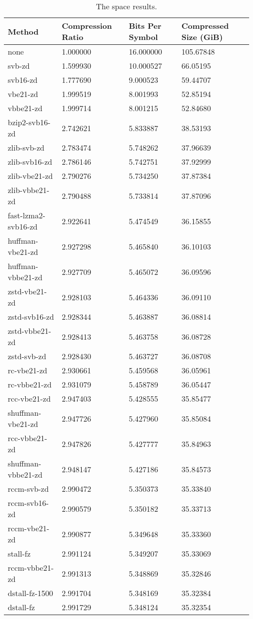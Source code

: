 \begin{table}
    \caption{\label{tab:results-space} The space results.}
	\begin{tabular}{|l|l|l|l|}
	    \hline
	    Method & Compression Ratio & Bits Per Symbol & Compressed Size (GiB) \\
\hline
		none   & 1.000000 &16.000000 &105.67848\\
              svb-zd   & 1.599930 &10.000527 & 66.05195\\
            svb16-zd   & 1.777690 & 9.000523 & 59.44707\\
            vbe21-zd   & 1.999519 & 8.001993 & 52.85194\\
	   vbbe21-zd   & 1.999714 & 8.001215 & 52.84680\\
      bzip2-svb16-zd   & 2.742621 & 5.833887 & 38.53193\\
         zlib-svb-zd   & 2.783474 & 5.748262 & 37.96639\\
       zlib-svb16-zd   & 2.786146 & 5.742751 & 37.92999\\
       zlib-vbe21-zd   & 2.790276 & 5.734250 & 37.87384\\
      zlib-vbbe21-zd   & 2.790488 & 5.733814 & 37.87096\\
 fast-lzma2-svb16-zd   & 2.922641 & 5.474549 & 36.15855\\
    huffman-vbe21-zd   & 2.927298 & 5.465840 & 36.10103\\
   huffman-vbbe21-zd   & 2.927709 & 5.465072 & 36.09596\\
       zstd-vbe21-zd   & 2.928103 & 5.464336 & 36.09110\\
       zstd-svb16-zd   & 2.928344 & 5.463887 & 36.08814\\
      zstd-vbbe21-zd   & 2.928413 & 5.463758 & 36.08728\\
         zstd-svb-zd   & 2.928430 & 5.463727 & 36.08708\\
         rc-vbe21-zd   & 2.930661 & 5.459568 & 36.05961\\
        rc-vbbe21-zd   & 2.931079 & 5.458789 & 36.05447\\
        rcc-vbe21-zd   & 2.947403 & 5.428555 & 35.85477\\
   shuffman-vbe21-zd   & 2.947726 & 5.427960 & 35.85084\\
       rcc-vbbe21-zd   & 2.947826 & 5.427777 & 35.84963\\
  shuffman-vbbe21-zd   & 2.948147 & 5.427186 & 35.84573\\
         rccm-svb-zd   & 2.990472 & 5.350373 & 35.33840\\
       rccm-svb16-zd   & 2.990579 & 5.350182 & 35.33713\\
       rccm-vbe21-zd   & 2.990877 & 5.349648 & 35.33360\\
            stall-fz   & 2.991124 & 5.349207 & 35.33069\\
      rccm-vbbe21-zd   & 2.991313 & 5.348869 & 35.32846\\
      dstall-fz-1500   & 2.991704 & 5.348169 & 35.32384\\
           dstall-fz   & 2.991729 & 5.348124 & 35.32354\\
	\hline
    \end{tabular}
\end{table}
